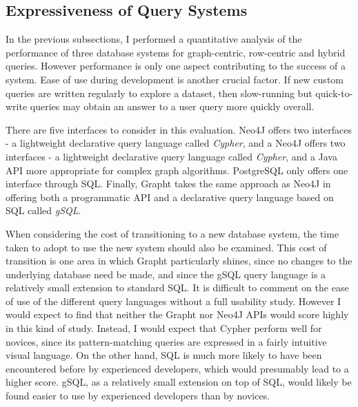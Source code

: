 

\subsection{Expressiveness of Query Systems} %
\label{sub:expressiveness_of_query_systems}


In the previous subsections, I performed a quantitative analysis of the
performance of three database systems for graph-centric, row-centric and
hybrid queries. However performance is only one aspect contributing to the
success of  a system. Ease of use during development is another crucial
factor. If new custom queries are written regularly to explore a dataset, then
slow-running but quick-to-write queries may obtain an answer to a user query
more quickly overall.  

There are five interfaces to consider in this evaluation. Neo4J offers two
interfaces - a lightweight declarative query language called \textit{Cypher},
and a Neo4J offers two interfaces - a lightweight declarative query language
called \textit{Cypher}, and a Java API more appropriate for complex graph
algorithms. PostgreSQL only offers one interface through SQL. Finally, Grapht
takes the same approach as Neo4J in offering both a programmatic API and a
declarative query language based on SQL called \textit{gSQL}.

When considering the cost of transitioning to a new database system, the time
taken to adopt to use the new system should also be examined. This
cost of transition is one area in which Grapht particularly shines, since no
changes to the underlying database need be made, and  since the gSQL query
language is a relatively small extension to standard SQL. It is difficult to
comment on the ease of use of the different query languages without a full
usability study. However I would expect to find that neither the Grapht nor
Neo4J APIs would score highly in this kind of study. Instead, I would expect
that Cypher perform well for novices, since its pattern-matching queries are
expressed in a fairly intuitive visual language. On the other hand, SQL is
much  more likely to have been encountered before by experienced developers,
which would presumably lead to a higher score. gSQL, as a relatively small
extension on top of SQL, would likely be found easier to use by experienced
developers than by novices.

